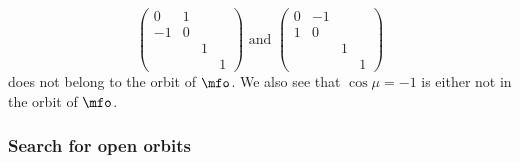 \begin{equation}
	\begin{pmatrix}
		0  & 1         \\
		-1 & 0         \\
		   &   & 1     \\
		   &   &   & 1
	\end{pmatrix}
	\text{ and }
	\begin{pmatrix}
		0 & -1         \\
		1 & 0          \\
		  &    & 1     \\
		  &    &   & 1
	\end{pmatrix}
\end{equation}
does not belong to the orbit of $\mfo$. We also see that $\cos \mu=-1$ is either not in the orbit of $\mfo$.

\subsubsection{Search for open orbits}

